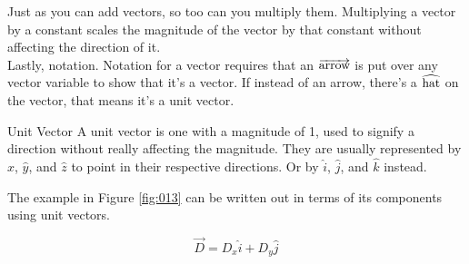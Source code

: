 \documentclass[12pt]{article}
\begin{document}
Just as you can add vectors, so too can you multiply them. Multiplying a vector by a constant
scales the magnitude of the vector by that constant without affecting the direction of it.
\\
Lastly, notation. Notation for a vector requires that an $\overrightarrow{\textup{arrow}}$ is put over
any vector variable to show that it's a vector. If instead of an arrow, there's a $\widehat{\textup{hat}}$ on
the vector, that means it's a unit vector.

\begin{definition}{Unit Vector}
  A unit vector is one with a magnitude of 1, used to signify a direction without really
  affecting the magnitude. They are usually represented by $\hat{x}$, $\hat{y}$, and $\hat{z}$ to point in their
  respective directions. Or by $\hat{i}$, $\hat{j}$, and $\hat{k}$ instead.
\end{definition}

The example in Figure \ref{fig:013} can be written out in terms of its components using unit
vectors.

\begin{equation*}
  \overrightarrow{D}=D_x\hat{i}+D_y\hat{j}
\end{equation*}
\end{document}

